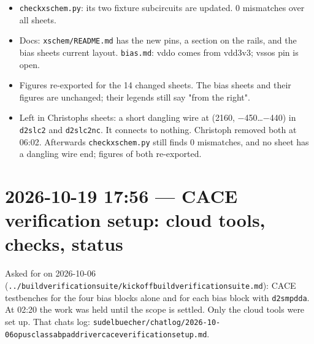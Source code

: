 \documentclass[11pt,a4paper]{article}
\providecommand{\tightlist}{\setlength{\itemsep}{0pt}\setlength{\parskip}{0pt}}
\renewcommand{\_}{\textunderscore\hspace{0pt}}
\begin{document}
\begin{itemize}
  \begin{itemize}
  \tightlist
  \item
    \texttt{run\_bias.py} no longer builds a split
    copy of \texttt{d2s\_mpdda}:
    \texttt{split\_driver()} is gone, and the
    netlist is included as it is.
  \item
    \texttt{run\_improvements.py} ties vddo / vsso
    to vdd / vss for the cells that have them.
  \item
    \texttt{results\_improvements.txt} is
    reproduced exactly, and so are the driver,
    corners and rails sections of
    \texttt{results\_bias.txt}.
  \end{itemize}
\item
  \texttt{check\_xschem.py}: its two fixture
  subcircuits are updated. 0 mismatches over all
  sheets.
\item
  Docs: \texttt{xschem/README.md} has the new
  pins, a section on the rails, and the bias
  sheets\textquotesingle{} current layout.
  \texttt{bias.md}: vddo comes from vdd\_3v3;
  vsso\textquotesingle s pin is open.
\item
  Figures re-exported for the 14 changed sheets.
  The bias sheets and their figures are unchanged;
  their legends still say "from the right".
\item
  Left in Christoph\textquotesingle s sheets: a
  short dangling wire at (2160, −450\ldots−440) in
  \texttt{d2s\_lc2} and \texttt{d2s\_lc2\_nc}. It
  connects to nothing. Christoph removed both at
  06:02. Afterwards \texttt{check\_xschem.py}
  still finds 0 mismatches, and no sheet has a
  dangling wire end; figures of both re-exported.
\end{itemize}

\hypertarget{2026-10-19-1756--cace-verification-setup-cloud-tools-checks-status}{%
\section{2026-10-19 17:56 --- CACE verification
setup: cloud tools, checks,
status}\label{2026-10-19-1756--cace-verification-setup-cloud-tools-checks-status}}

Asked for on 2026-10-06
(\texttt{../build\_verification\_suite/kickoff\_build\_verification\_suite.md}):
CACE testbenches for the four bias blocks alone
and for each bias block with \texttt{d2s\_mpdda}.
At 02:20 the work was held until the scope is
settled. Only the cloud tools were set up. That
chat\textquotesingle s log:
\texttt{sudelbuecher/chatlog/2026-10-06\_opus\_class\_ab\_pad\_driver\_cace\_verification\_setup.md}.
\end{document}
